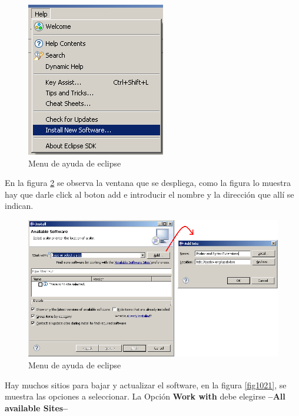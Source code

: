 \documentclass[12pt, twoside]{report}
\begin{document}
\begin{figure}
	\centering
	\includegraphics[width=0.5\linewidth]{Pydev1.png}
	\caption{Menu de ayuda de eclipse}
	\label{fig1019}
\end{figure}

En la figura \ref{fig1020} se observa la ventana que se despliega, como la figura lo muestra hay que darle click al boton add e introducir el nombre y la dirección que allí se indican.
\begin{figure}
	\centering
	\includegraphics[width=1.0\linewidth]{Pydev2.png}
	\caption{Menu de ayuda de eclipse}
	\label{fig1020}
\end{figure}

Hay muchos sitios para bajar y actualizar el software, en la figura \ref{fig1021}, se muestra las opciones a seleccionar. La Opción \textbf{Work with} debe elegirse \textbf{--All available Sites--}
\end{document}
